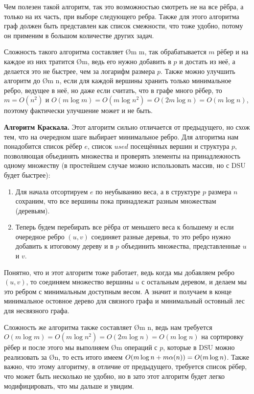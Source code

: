 Чем полезен такой алгоритм, так это возможностью смотреть не на все рёбра, а только на их часть, при выборе следующего ребра. Также для этого алгоритма граф должен быть представлен как список смежности, что тоже удобно, потому он применим в большом количестве других задач. 

Сложность такого алгоритма составляет \O{m \log m}, так обрабатывается $m$ рёбер и на каждое из них тратится \O{\log m}, ведь его нужно добавить в $p$ и достать из неё, а делается это не быстрее, чем за логарифм размера $p$. Также можно улучшить алгоритм до \O{m \log n}, если для каждой вершины хранить только минимальное ребро, ведущее в неё, но даже если считать, что в графе много рёбер, то $m = O(n^2)$ и $O(m \log m) = O(m \log n^2) = O(2m \log n) = O(m \log n)$, поэтому фактически улучшение может и не быть.

\textbf{Алгоритм Краскала.} Этот алгоритм сильно отличается от предыдущего, но схож тем, что на очередном шаге выбирает минимальное ребро. Для алгоритма нам понадобится список рёбер $e$, список $used$ посещённых вершин и структура $p$, позволяющая объединять множества и проверять элементы на принадлежность одному множеству (в простейшем случае можно использовать массив, но с DSU будет быстрее):

\begin{box-algo}
    \begin{enumerate}
        \item Для начала отсортируем $e$ по неубыванию веса, а в структуре $p$ размера $n$ сохраним, что все вершины пока принадлежат разным множествам (деревьям).
        \item Теперь будем перебирать все рёбра от меньшего веса к большему и если очередное ребро $(u, v)$ соединяет разные деревья, то это ребро нужно добавить к итоговому дереву и в $p$ объединить множества, представленные $u$ и $v$.
    \end{enumerate}
\end{box-algo}

Понятно, что и этот алгоритм тоже работает, ведь когда мы добавляем ребро $(u, v)$, то соединяем множество вершины $u$ с остальным деревом, и делаем мы это ребром с минимальным доступным весом. А значит и получаем в конце минимальное остовное дерево для связного графа и минимальный остовный лес для несвязного графа.

Сложность же алгоритма также составляет \O{m \log n}, ведь нам требуется $O(m \log m) = O(m \log n^2) = O(2m \log n) = O(m \log n)$ на сортировку рёбер и после этого мы выполняем \O{m} операций с $p$, которые в DSU можно реализовать за \O{\ac{n}}, то есть итого имеем $O(m \log n + m \alpha(n)) = O(m \log n)$. Также важно, что этому алгоритму, в отличие от предыдущего, требуется список рёбер, что может быть несколько не удобно, но в зато этот алгоритм будет легко модифицировать, что мы дальше и увидим.


